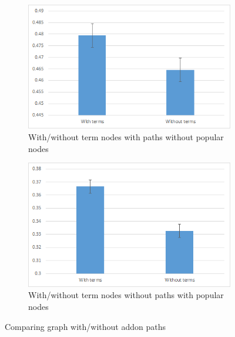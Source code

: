 \documentclass[11pt,oneside]{book}
\begin{document}
\begin{figure}[t]
\centering
\begin{subfigure}[b]{0.49\textwidth}
	\centering
\includegraphics[scale=0.49]{figures/5addonswithoutTermsComp.png}
\caption{With/without term nodes with paths without popular nodes}
\label{fig:with_without_terms5}
\end{subfigure}
\begin{subfigure}[b]{0.49\textwidth}
	\centering
\includegraphics[scale=0.49]{figures/2addonswithoutTermsComp.png}
\caption{With/without term nodes without paths with popular nodes}
\label{fig:with_without_terms2}
\end{subfigure}
\caption{Comparing graph with/without addon paths}
	\label{fig:with_without_terms}
\end{figure}
\end{document}
